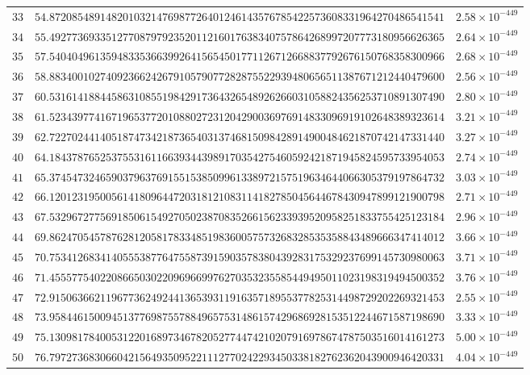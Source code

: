\documentclass[12pt,reqno]{amsart}
\theoremstyle{remark}
\begin{document}
\begin{longtable}{clc}
$33$ & $54.8720854891482010321476987726401246143576785422573608331964270486541541$ & $2.58\times 10^{-449}$ \\
$34$ & $55.4927736933512770879792352011216017638340757864268997207773180956626365$ & $2.64\times 10^{-449}$ \\
$35$ & $57.5404049613594833536639926415654501771126712668837792676150768358300966$ & $2.68\times 10^{-449}$ \\
$36$ & $58.8834001027409236624267910579077282875522939480656511387671212440479600$ & $2.56\times 10^{-449}$ \\
$37$ & $60.5316141884458631085519842917364326548926266031058824356253710891307490$ & $2.80\times 10^{-449}$ \\
$38$ & $61.5234397741671965377201088027231204290036976914833096919102648389323614$ & $3.21\times 10^{-449}$ \\
$39$ & $62.7227024414051874734218736540313746815098428914900484621870742147331440$ & $3.27\times 10^{-449}$ \\
$40$ & $64.1843787652537553161166393443989170354275460592421871945824595733954053$ & $2.74\times 10^{-449}$ \\
$41$ & $65.3745473246590379637691551538509961338972157519634644066305379197864732$ & $3.03\times 10^{-449}$ \\
$42$ & $66.1201231950056141809644720318121083114182785045644678430947899121900798$ & $2.71\times 10^{-449}$ \\
$43$ & $67.5329672775691850615492705023870835266156233939520958251833755425123184$ & $2.96\times 10^{-449}$ \\
$44$ & $69.8624705457876281205817833485198360057573268328535358843489666347414012$ & $3.66\times 10^{-449}$ \\
$45$ & $70.7534126834140555387764755873915903578380439283175329237699145730980063$ & $3.71\times 10^{-449}$ \\
$46$ & $71.4555775402208665030220969669976270353235585449495011023198319494500352$ & $3.76\times 10^{-449}$ \\
$47$ & $72.9150636621196773624924413653931191635718955377825314498729202269321453$ & $2.55\times 10^{-449}$ \\
$48$ & $73.9584461500945137769875578849657531486157429686928153512244671587198690$ & $3.33\times 10^{-449}$ \\
$49$ & $75.1309817840053122016897346782052774474210207916978674787503516014161273$ & $5.00\times 10^{-449}$ \\
$50$ & $76.7972736830660421564935095221112770242293450338182762362043900946420331$ & $4.04\times 10^{-449}$ \\

\end{longtable}
\end{document}
